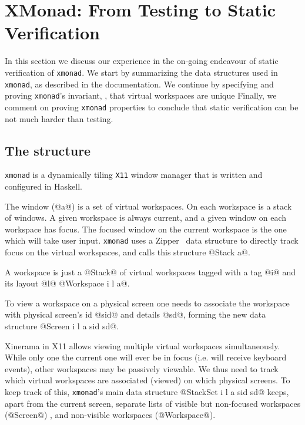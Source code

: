 \newcommand\lbxmonad{\texttt{xmonad}\xspace}

\section{XMonad: From Testing to Static Verification}\label{sec:xmonad}

In this section we discuss our experience in the on-going endeavour of 
static verification of \lbxmonad.
%
We start by summarizing the data structures used in \lbxmonad, as described in the documentation.
%
We continue by specifying and proving \lbxmonad's invariant, \ie, that
virtual workspaces are unique
%
Finally, we comment on proving \lbxmonad properties to conclude 
that static verification can be not much harder than testing.

\subsection{The structure}

\lbxmonad is a dynamically tiling \texttt{X11} 
window manager that is written and configured in Haskell.

The window (@a@) is a set of virtual workspaces. 
On each workspace is a stack of windows. 
A given workspace is always current, and a given
window on each workspace has focus. 
The focused window on the current
workspace is the one which will take user input. 
%
\lbxmonad uses a Zipper~\citep{zipper} data structure 
to directly track focus on the virtual workspaces, 
and calls this structure @Stack a@.

A workspace is just a @Stack@ of virtual workspaces 
tagged with a tag @i@ and its layout @l@
@Workspace i l a@.

To view a workspace on a physical screen one needs to 
associate the workspace with physical screen's id @sid@
and details @sd@, 
forming the new data structure @Screen i l a sid sd@.

Xinerama in X11 allows viewing multiple virtual workspaces
simultaneously. 
%
While only one the current one will ever be in focus (i.e. will
receive keyboard events), other workspaces may be passively
viewable.  
%
We thus need to track which virtual workspaces are
associated (viewed) on which physical screens.  
%
To keep track of
this, \lbxmonad's main data structure  @StackSet i l a sid sd@ 
keeps, apart from the current screen,
separate lists of visible but non-focused
workspaces (@Screen@) , and non-visible workspaces (@Workspace@).

